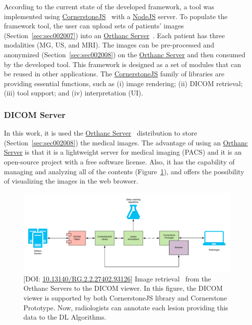 According to the current state of the developed framework, a tool was implemented using \href{https://cornerstonejs.org/}{CornerstoneJS}~\cite{urban2017lesiontracker} with a \href{https://nodejs.org}{NodeJS} server.
To populate the framework tool, the user can upload sets of patients' images (Section~\ref{sec:sec002007}) into an \href{https://www.orthanc-server.com}{Orthanc Server}~\cite{Jodogne2018}.
Each patient has three modalities (\ac{MG}, \ac{US}, and \ac{MRI}).
The images can be pre-processed and anonymized (Section~\ref{sec:sec002008}) on the \href{https://www.orthanc-server.com}{Orthanc Server} and then consumed by the developed tool.
This framework is designed as a set of modules that can be reused in other applications.
The \href{https://cornerstonejs.org/}{CornerstoneJS} family of libraries are providing essential functions, such as
(i) image rendering;
(ii) \ac{DICOM} retrieval;
(iii) tool support; and
(iv) interpretation (UI).

\subsubsection{DICOM Server}
\label{sec:sec004004001002}

In this work, it is used the \href{https://www.orthanc-server.com}{Orthanc Server}~\cite{Jodogne2018} distribution to store (Section~\ref{sec:sec002008}) the medical images.
The advantage of using an \href{https://www.orthanc-server.com}{Orthanc Server} is that it is a lightweight server for medical imaging (\ac{PACS}) and it is an open-source project with a free software license.
Also, it has the capability of managing and analyzing all of the contents (Figure~\ref{fig:fig030}), and offers the possibility of visualizing the images in the web browser.

\hfill
\begin{figure}[ht]
\centering
\includegraphics[width=\textwidth]{images/fig030}
\caption{[DOI: \href{http://rgdoi.net/10.13140/RG.2.2.27402.93126}{10.13140/RG.2.2.27402.93126}] Image retrieval~\cite{calisto2019micpuw} from the Orthanc Servers to the DICOM viewer. In this figure, the DICOM viewer is supported by both CornerstoneJS library and Cornerstone Prototype. Now, radiologists can annotate each lesion providing this data to the DL Algorithms.}
\label{fig:fig030}
\end{figure}
\hfill

